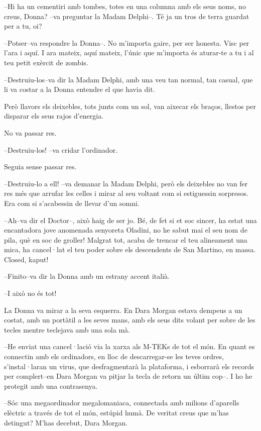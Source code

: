 --Hi ha un cementiri amb tombes, totes en una columna amb els seus noms,
no creus, Donna? --va preguntar la Madam Delphi--. Té ja un tros de
terra guardat per a tu, oi?

--Potser--va respondre la Donna--. No m'importa gaire, per ser honesta.
Visc per l'ara i aquí. I ara mateix, aquí mateix, l'únic que m'importa
és aturar-te a tu i al teu petit exèrcit de zombis.

--Destruiu-los--va dir la Madam Delphi, amb una veu tan normal, tan
casual, que li va costar a la Donna entendre el que havia dit.

Però llavors els deixebles, tots junts com un sol, van aixecar els
braços, llestos per disparar els seus rajos d'energia.

No va passar res.

--Destruiu-los! --va cridar l'ordinador.

Seguia sense passar res.

--Destruiu-lo a ell! --va demanar la Madam Delphi, però els deixebles no
van fer res més que arrufar les celles i mirar al seu voltant com si
estiguessin sorpresos. Era com si s'acabessin de llevar d'un somni.

--Ah--va dir el Doctor--, això haig de ser jo. Bé, de fet si et soc
sincer, ha estat una encantadora jove anomenada senyoreta Oladini, no he
sabut mai el seu nom de pila, què en soc de groller! Malgrat tot, acaba
de trencar el teu alineament una mica, ha cancel·lat el teu poder sobre
els descendents de San Martino, en massa. Closed, kaput!

--Finito--va dir la Donna amb un estrany accent italià.

--I això no és tot!

La Donna va mirar a la seva esquerra. En Dara Morgan estava dempeus a un
costat, amb un portàtil a les seves mans, amb els seus dits volant per
sobre de les tecles mentre teclejava amb una sola mà.

--He enviat una cancel·lació via la xarxa als M-TEKs de tot el món. En
quant es connectin amb els ordinadors, en lloc de descarregar-se les
teves ordres, s'instal·laran un virus, que desfragmentarà la plataforma,
i esborrarà els records per complert--en Dara Morgan va pitjar la tecla
de retorn un últim cop--. I ho he protegit amb una contrasenya.

--Sóc una megaordinador megalomaniaca, connectada amb milions d'aparells
elèctric a través de tot el món, estúpid humà. De veritat creus que
m'has detingut? M'has decebut, Dara Morgan.

